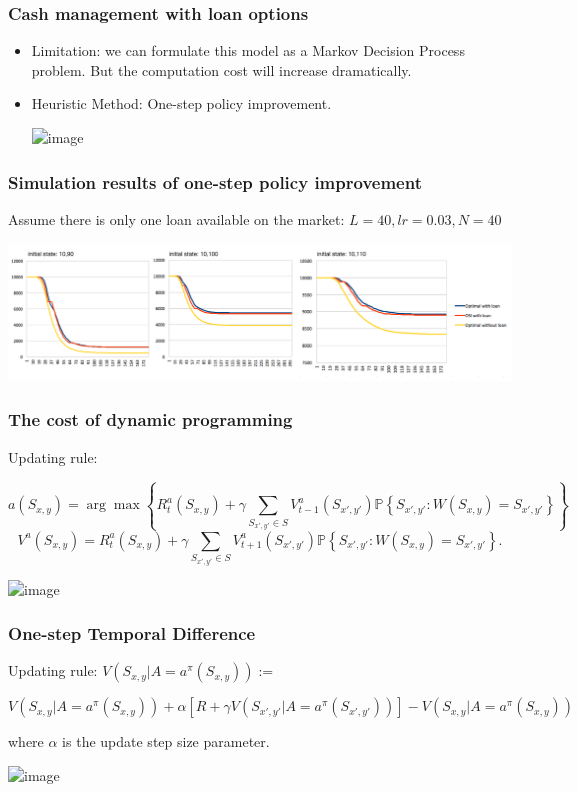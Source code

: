 \documentclass{beamer}
\begin{document}
\begin{frame}
\frametitle{Cash management with loan options}
\begin{itemize}
\item<2-> Limitation: we can formulate this model as a Markov Decision Process problem. But the computation cost will increase dramatically.
\item<3->  Heuristic Method: One-step policy improvement.


\includegraphics<4->[scale=.2]{oneImprov}

\end{itemize}
\end{frame}

\begin{frame}
\frametitle{Simulation results of one-step policy improvement}
Assume there is only one loan available on the market: $L = 40, lr = 0.03, N = 40$


\includegraphics[scale=.22]{oneStep}
\end{frame}

\begin{frame}
\frametitle{The cost of dynamic programming}
Updating rule:
\begin{small}
$$ a(S_{x,y}) = \arg\max \left\{   
R_t^{a}(S_{x,y}) + \gamma \sum_{S_{x',y'}\in S} V^{a}_{t-1}(S_{x',y'})
\mathbb{P}\left\{S_{x',y'}:W(S_{x, y}) = S_{x', y'} \right\}
 \right\} $$
$$V^a(S_{x,y}) =  R_t^{a}(S_{x,y}) + \gamma \sum_{S_{x',y'}\in S} V^{a}_{t+1}(S_{x',y'})
\mathbb{P}\left\{S_{x',y'}:W(S_{x, y}) = S_{x', y'} \right\}.$$
\end{small}
\includegraphics<2->[scale=.16]{dp}

\end{frame}

\begin{frame}
\frametitle{One-step Temporal Difference}
Updating rule: $V(S_{x,y}|A=a^\pi(S_{x,y})) :=$
\begin{small}
 $$V(S_{x,y}|A=a^\pi(S_{x,y})) + \alpha \left[ R + \gamma V(S_{x',y'}|A=a^\pi (S_{x',y'}))\right] - V(S_{x,y}|A=a^\pi(S_{x,y}))$$ 
 \end{small}
 where $\alpha$ is the update step size parameter.

\includegraphics<2->[scale=.4]{OneTD}
\end{frame}
\end{document}
